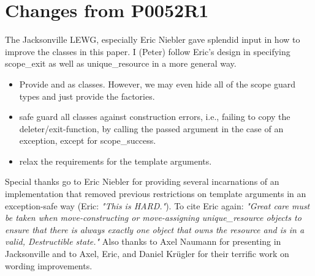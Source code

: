\documentclass[ebook,11pt,article]{memoir}
\begin{document}
\section{Changes from P0052R1}
The Jacksonville LEWG, especially Eric Niebler gave splendid input in how to improve the classes in this paper. I (Peter) follow Eric's design in specifying scope_exit as well as unique_resource in a more general way.
\begin{itemize}
\item Provide  and  as classes. However, we may even hide all of the scope guard types and just provide the factories.
\item safe guard all classes against construction errors, i.e., failing to copy the deleter/exit-function, by calling the passed argument in the case of an exception, except for scope_success.
\item relax the requirements for the template arguments.
\end{itemize}
Special thanks go to Eric Niebler for providing several incarnations of an implementation that removed previous restrictions on template arguments in an exception-safe way (Eric: \textit{"This is HARD."}). To cite Eric again: \textit{"Great care must be taken when move-constructing or
move-assigning unique_resource objects to ensure that there is always
exactly one object that owns the resource and is in a valid,
Destructible state."}
Also thanks to Axel Naumann for presenting in Jacksonville and to Axel, Eric, and Daniel Kr\"ugler for their terrific work on wording improvements.
\end{document}
